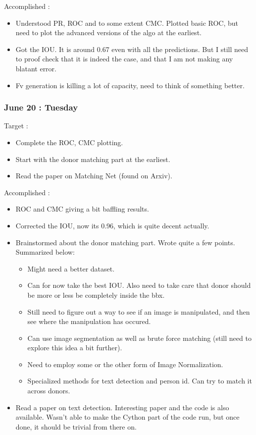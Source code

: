 \documentclass{article}
\begin{document}
Accomplished :
\begin{itemize}
\item Understood PR, ROC and  to some extent CMC. Plotted basic ROC, but need to plot the advanced versions of the algo at the earliest.
\item Got the IOU. It is around 0.67 even with all the predictions. But I still need to proof check that it is indeed the case, and that I am not making any blatant error.
\item Fv generation is killing a lot of capacity, need to think of something better.
\end{itemize}


\subsubsection{June 20 : Tuesday}
Target :
\begin{itemize}
\item Complete the ROC, CMC plotting.
\item Start with the donor matching part at the earliest.
\item Read the paper on Matching Net (found on Arxiv).
\end{itemize}

Accomplished :
\begin{itemize}
\item ROC and CMC giving a bit baffling results.
\item Corrected the IOU, now its 0.96, which is quite decent actually.
\item Brainstormed about the donor matching part. Wrote quite a few points. Summarized below:
  \begin{itemize}
  \item Might need a better dataset.
  \item Can for now take the best IOU. Also need to take care that donor should be more or less be completely inside the bbx.
  \item Still need to figure out a way to see if an image is manipulated, and then see where the manipulation has occured.
  \item Can use image segmentation as well as brute force matching (still need to explore this idea a bit further).
  \item Need to employ some or the other form of Image Normalization.
  \item Specialized methods for text detection and person id. Can try to match it across donors.
  \end{itemize}
\item Read a paper on text detection. Interesting paper and the code is also available. Wasn't able to make the Cython part of the code run, but once done, it should be trivial from there on.
\end{itemize}
\end{document}
